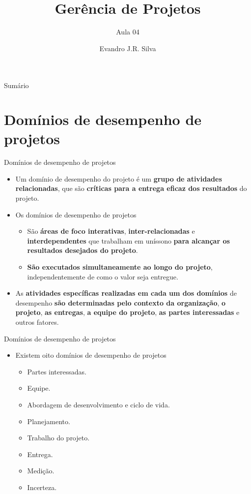 \documentclass{beamer}
\title[GP 04]{Gerência de Projetos}
\subtitle{Aula 04}
\author[E.J.R. Silva]{Evandro J.R. Silva}
\date{}
\begin{document}
    
\begin{frame}
    \titlepage
\end{frame}

\begin{frame}{Sumário}
    \tableofcontents
\end{frame}

\section{Domínios de desempenho de projetos}

\begin{frame}{Domínios de desempenho de projetos}
    \begin{itemize}
        \justifying
        \item<1-> Um domínio de desempenho do projeto é um \textbf{grupo de atividades relacionadas}, que são \textbf{críticas para a entrega eficaz dos resultados} do projeto.
        \item<2-> Os domínios de desempenho de projetos
        	\begin{itemize}
        		\justifying
        		\item<2-> São \textbf{áreas de foco interativas}, \textbf{inter-relacionadas} e \textbf{interdependentes} que trabalham em uníssono \textbf{para alcançar os resultados desejados do projeto}.
        		\item<3-> \textbf{São executados simultaneamente ao longo do projeto}, independentemente de como o valor seja entregue.
        	\end{itemize}
        \item<4> As \textbf{atividades específicas realizadas em cada um dos domínios} de desempenho \textbf{são determinadas pelo contexto da organização}, \textbf{o projeto}, \textbf{as entregas}, \textbf{a equipe do projeto}, \textbf{as partes interessadas} e outros fatores.
    \end{itemize}
\end{frame}

\begin{frame}{Domínios de desempenho de projetos}
	\begin{itemize}
		\item Existem oito domínios de desempenho de projetos
			\begin{itemize}
				\item Partes interessadas.
				\item Equipe.
				\item Abordagem de desenvolvimento e ciclo de vida.
				\item Planejamento.
				\item Trabalho do projeto.
				\item Entrega.
				\item Medição.
				\item Incerteza.
			\end{itemize}
	\end{itemize}
\end{frame}
\end{document}
